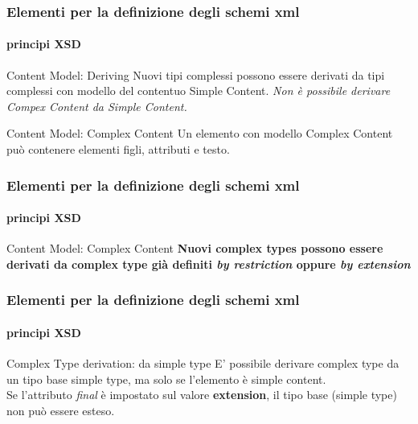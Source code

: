 



\begin{frame}
	\frametitle{Elementi per la definizione degli schemi xml}
	\framesubtitle{principi XSD}
	\addtocounter{nframe}{1}

	\begin{block}{Content Model: Deriving}
		Nuovi tipi complessi possono essere derivati da tipi complessi con modello del contentuo Simple Content.
		\textit{Non è possibile derivare Compex Content da Simple Content.}
	\end{block}

	\begin{block}{Content Model: Complex Content}
		Un elemento con modello Complex Content può contenere elementi figli, attributi e testo.
	\end{block}
\end{frame}

\begin{frame}
	\frametitle{Elementi per la definizione degli schemi xml}
	\framesubtitle{principi XSD}
	\addtocounter{nframe}{1}

	\begin{block}{Content Model: Complex Content}
		\textbf{Nuovi complex types possono essere derivati da complex type già definiti \textit{by restriction} oppure \textit{by extension}}
	\end{block}
\end{frame}

\begin{frame}
	\frametitle{Elementi per la definizione degli schemi xml}
	\framesubtitle{principi XSD}
	\addtocounter{nframe}{1}

	\begin{block}{Complex Type derivation: da simple type}
		E' possibile derivare complex type da un tipo base simple type, ma solo se l'elemento è simple content.
		\\Se l'attributo \textit{final} è impostato sul valore \textbf{extension}, il tipo base (simple type) non può essere esteso.

	\end{block}

\end{frame}

